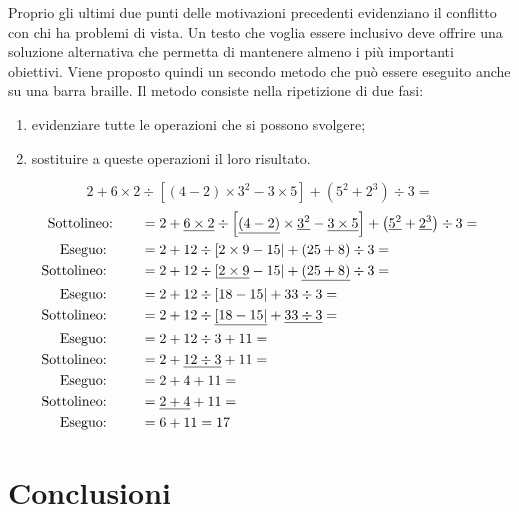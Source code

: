 \documentclass[a4paper,10pt]{article}
\begin{document}
\espressionealberoa

Proprio gli ultimi due punti delle motivazioni precedenti evidenziano il 
conflitto con chi ha problemi di vista.
Un testo che voglia essere inclusivo deve offrire una soluzione alternativa 
che permetta di mantenere almeno i più importanti obiettivi.
Viene proposto quindi un secondo metodo che può essere eseguito anche su una 
barra braille.
Il metodo consiste nella ripetizione di due fasi:

\begin{enumerate} [noitemsep]
\item evidenziare tutte le operazioni che si possono svolgere;
\item sostituire a queste operazioni il loro risultato.
\end{enumerate}

\[2 + 6 \times 2 \div 
 \left[ \left(4 -2 \right) \times 3^{2} - 3 \times 5 \right] +
 \left( 5^{2} + 2^{3} \right) \div 3 =\]
\begin{align*}
\text{Sottolineo:} \qquad &= 2 + 
 \underline{6 \times 2} \div \left[ \underline{\left(4 -2 \right)} 
   \times \underline{3^{2}} - 
   \underline{3 \times 5} \right] +
 \left( \underline{5^{2}} + \underline{2^{3}} \right) \div 3 =\\
\text{Eseguo: } \qquad &= 2 + 
 12 \div \left[ 2 \times 9 - 15 \right| +
 \left( 25 + 8 \right) \div 3 =\\
\text{Sottolineo: } \qquad &= 2 + 
 12 \div \left[ \underline{2 \times 9} - 15 \right| +
 \underline{\left( 25 + 8 \right)} \div 3 = \hspace{20mm}\\ 
\text{Eseguo: } \qquad &= 2 + 12 \div \left[ 18 - 15 \right| +
 33 \div 3 =\\ 
\text{Sottolineo: } \qquad &= 2 + 
 12 \div \underline{\left[ 18 - 15 \right|} +
 \underline{33 \div 3} = \\ 
\text{Eseguo: } \qquad &= 2 + 
 12 \div 3 +
 11 = \\ 
\text{Sottolineo: } \qquad &= 2 + 
 \underline{12 \div 3} +
 11 = \\ 
\text{Eseguo: } \qquad &= 2 + 
 4 +
 11 = \\ 
\text{Sottolineo: } \qquad &= \underline{2 +  4} + 11 = \\ 
\text{Eseguo: } \qquad &= 6 + 11 = 17
\end{align*}


\section{Conclusioni}
\end{document}
